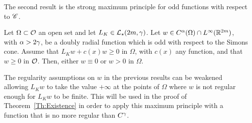 The second result is the strong maximum principle for odd functions with respect to $\mathscr{C}$.

\begin{proposition}
	\label{Prop:StrongMaximumPrincipleForOddFunctions} Let $\Omega \subset \mathcal{O}$ an open set and let $L_K  \in \mathcal{L}_\star (2m,  \gamma)$.  Let $w\in C^{\alpha}(\Omega)\cap L^\infty(\mathbb{R}^{2m})$, with $\alpha > 2\gamma$, be a doubly radial function which is odd with respect to the Simons cone. Assume that $L_K w + c(x) w\geq 0$ in $\Omega$, with $c(x)$ any function, and that $w\geq 0$ in $\mathcal{O}$. Then, either $w\equiv 0$ or $w > 0$ in $\Omega$.
\end{proposition}

\begin{remark}
	\label{Remark:MaxPrincipleSingularity}
	The regularity assumptions on $w$ in the previous results can be weakened allowing $L_K w$ to take the value $+\infty$ at the points of $\Omega$ where $w$ is not regular enough for $L_K w$ to be finite. This will be used in the proof of Theorem~\ref{Th:Existence} in order to apply this maximum principle with a function that is no more regular than $C^\gamma$.
\end{remark}

